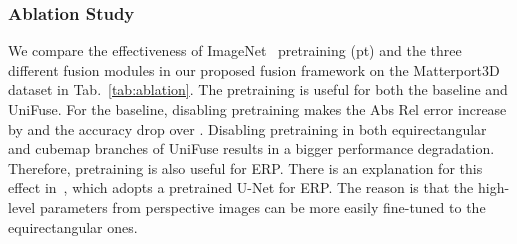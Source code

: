 \documentclass[letterpaper, 10 pt, conference]{ieeeconf}
\begin{document}
\subsubsection{Ablation Study}


\begin{table}[t]
\vspace{6pt}
  \centering
\caption{\textbf{Ablation Study.}}
\label{tab:ablation}
\end{table}

We compare the effectiveness of { ImageNet~\cite{deng2009imagenet} pretraining (pt) and} the three different fusion modules in our proposed fusion framework on the Matterport3D dataset in Tab.~\ref{tab:ablation}. 
{The pretraining is useful for both the baseline and UniFuse. For the baseline, disabling pretraining makes the Abs Rel error increase by  and the  accuracy drop over . Disabling pretraining in both equirectangular and cubemap branches of  UniFuse results in a bigger performance degradation. Therefore, pretraining is also useful for ERP. There is an explanation for this effect in~\cite{jin2020geometric}, which adopts a pretrained U-Net for ERP. The reason is that the high-level parameters from perspective images can be more easily fine-tuned to the equirectangular ones.} 
\end{document}
